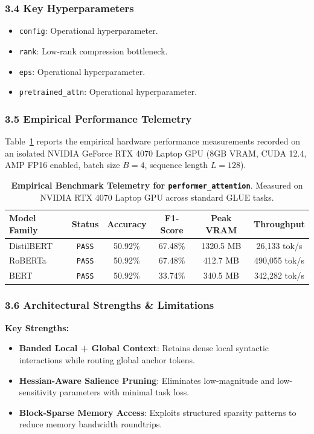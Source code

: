 \subsubsection*{3.4 Key Hyperparameters}
\begin{itemize}
    \item \texttt{config}: Operational hyperparameter.
    \item \texttt{rank}: Low-rank compression bottleneck.
    \item \texttt{eps}: Operational hyperparameter.
    \item \texttt{pretrained\_attn}: Operational hyperparameter.
\end{itemize}

\subsubsection*{3.5 Empirical Performance Telemetry}
Table~\ref{tab:telemetry_performer_attention} reports the empirical hardware performance measurements recorded on an isolated NVIDIA GeForce RTX 4070 Laptop GPU (8GB VRAM, CUDA 12.4, AMP FP16 enabled, batch size $B=4$, sequence length $L=128$).

\begin{table}[h]
\centering
\small
\caption{\textbf{Empirical Benchmark Telemetry for \texttt{performer\_attention}}. Measured on NVIDIA RTX 4070 Laptop GPU across standard GLUE tasks.}
\label{tab:telemetry_performer_attention}
\begin{tabular*}{\columnwidth}{@{\extracolsep{\fill}}lccccc}
\toprule
\textbf{Model Family} & \textbf{Status} & \textbf{Accuracy} & \textbf{F1-Score} & \textbf{Peak VRAM} & \textbf{Throughput} \\
\midrule
DistilBERT & \texttt{PASS} & 50.92\% & 67.48\% & 1320.5 MB & 26,133 tok/s \\
RoBERTa & \texttt{PASS} & 50.92\% & 67.48\% & 412.7 MB & 490,055 tok/s \\
BERT & \texttt{PASS} & 50.92\% & 33.74\% & 340.5 MB & 342,282 tok/s \\
\bottomrule
\end{tabular*}
\end{table}

\subsubsection*{3.6 Architectural Strengths \& Limitations}
\textbf{Key Strengths:}
\begin{itemize}
    \item \textbf{Banded Local + Global Context}: Retains dense local syntactic interactions while routing global anchor tokens.
    \item \textbf{Hessian-Aware Salience Pruning}: Eliminates low-magnitude and low-sensitivity parameters with minimal task loss.
    \item \textbf{Block-Sparse Memory Access}: Exploits structured sparsity patterns to reduce memory bandwidth roundtrips.
\end{itemize}

